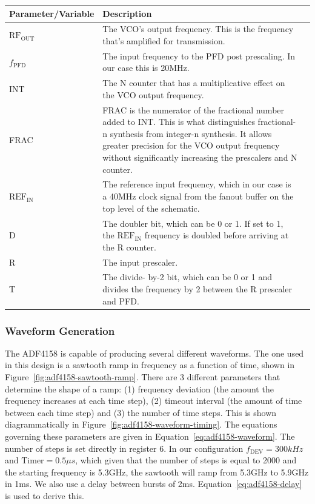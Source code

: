 \label{tab:adf4158-rfout-equation-vars}
\begin{tabularx}{\textwidth}{l X>{\raggedright\arraybackslash}X}
  \toprule
  \textbf{Parameter/Variable} & \textbf{Description} \\
  \midrule
  \endhead{}

  $\text{RF}_{\text{OUT}}$ & The VCO's output frequency. This is the frequency that's amplified for
  transmission. \\
  $f_{\text{PFD}}$ & The input frequency to the PFD post prescaling. In our case this is 20MHz. \\
  INT & The N counter that has a multiplicative effect on the VCO output frequency. \\
  FRAC & FRAC is the numerator of the fractional number added to INT. This is what distinguishes
         fractional-n synthesis from integer-n synthesis. It allows greater precision for the VCO
         output frequency without significantly increasing the prescalers and N counter. \\
  $\text{REF}_{\text{IN}} $ & The reference input frequency, which in our case is a 40MHz clock
                              signal from the fanout buffer on the top level of the schematic. \\
  D & The doubler bit, which can be 0 or 1. If set to 1, the $\text{REF}_{\text{IN}}$ frequency is
      doubled before arriving at the R counter. \\
  R & The input prescaler. \\
  T & The divide- by-2 bit, which can be 0 or 1 and divides the frequency by 2 between the R
      prescaler and PFD. \\

  \bottomrule
\end{tabularx}

\subsubsection{Waveform Generation}
\label{sec:adf4158-waveform-generation}

The ADF4158 is capable of producing several different waveforms. The one used in this design is a
sawtooth ramp in frequency as a function of time, shown in
Figure~\ref{fig:adf4158-sawtooth-ramp}. There are 3 different parameters that determine the shape of
a ramp: (1) frequency deviation (the amount the frequency increases at each time step), (2) timeout
interval (the amount of time between each time step) and (3) the number of time steps. This is shown
diagrammatically in Figure~\ref{fig:adf4158-waveform-timing}. The equations governing these
parameters are given in Equation~\ref{eq:adf4158-waveform}. The number of steps is set directly in
register 6. In our configuration $f_{\text{DEV}} = 300\si{kHz}$ and $\text{Timer} = 0.5\si{\mu s}$,
which given that the number of steps is equal to 2000 and the starting frequency is 5.3GHz, the
sawtooth will ramp from 5.3GHz to 5.9GHz in 1ms. We also use a delay between bursts of
2ms. Equation~\ref{eq:adf4158-delay} is used to derive this.

